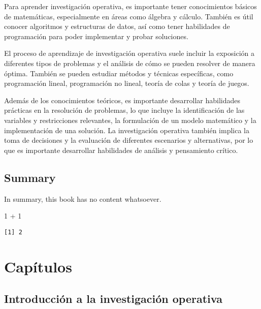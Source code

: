 \documentclass[
  letterpaper,
  DIV=11,
  numbers=noendperiod]{scrreprt}
\newenvironment{Shaded}{}{}
\newcommand{\DecValTok}[1]{\textcolor[rgb]{0.00,0.36,0.77}{#1}}
\newcommand{\SpecialCharTok}[1]{\textcolor[rgb]{0.00,0.36,0.77}{#1}}
\theoremstyle{definition}
\theoremstyle{definition}
\theoremstyle{remark}
\begin{document}
Para aprender investigación operativa, es importante tener conocimientos
básicos de matemáticas, especialmente en áreas como álgebra y cálculo.
También es útil conocer algoritmos y estructuras de datos, así como
tener habilidades de programación para poder implementar y probar
soluciones.

El proceso de aprendizaje de investigación operativa suele incluir la
exposición a diferentes tipos de problemas y el análisis de cómo se
pueden resolver de manera óptima. También se pueden estudiar métodos y
técnicas específicas, como programación lineal, programación no lineal,
teoría de colas y teoría de juegos.

Además de los conocimientos teóricos, es importante desarrollar
habilidades prácticas en la resolución de problemas, lo que incluye la
identificación de las variables y restricciones relevantes, la
formulación de un modelo matemático y la implementación de una solución.
La investigación operativa también implica la toma de decisiones y la
evaluación de diferentes escenarios y alternativas, por lo que es
importante desarrollar habilidades de análisis y pensamiento crítico.


\hypertarget{summary}{%
\chapter*{Summary}\label{summary}}


In summary, this book has no content whatsoever.

\begin{Shaded}
\begin{Highlighting}[]
\DecValTok{1} \SpecialCharTok{+} \DecValTok{1}
\end{Highlighting}
\end{Shaded}

\begin{verbatim}
[1] 2
\end{verbatim}

\part{Capítulos}

\hypertarget{introducciuxf3n-a-la-investigaciuxf3n-operativa}{%
\chapter{Introducción a la investigación
operativa}\label{introducciuxf3n-a-la-investigaciuxf3n-operativa}}
\end{document}

